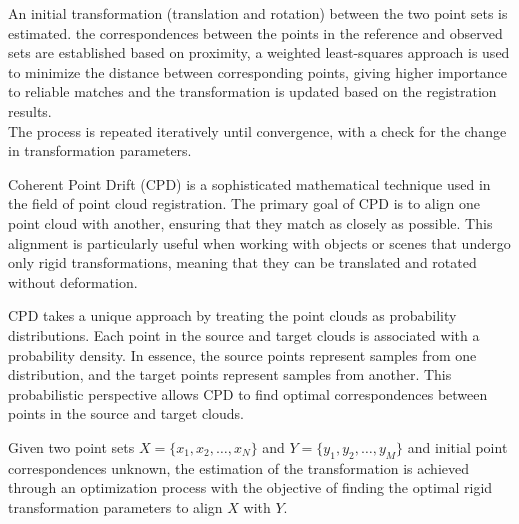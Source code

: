 An initial transformation (translation and rotation) between the two point sets is estimated. the correspondences between the points in the reference and observed sets are established based on proximity, a weighted least-squares approach is used to minimize the distance between corresponding points, giving higher importance to reliable matches and the transformation is updated based on the registration results.\\
The process is repeated iteratively until convergence, with a check for the change in transformation parameters.

Coherent Point Drift (CPD) \cite{CPD} is a sophisticated mathematical technique used in the field of point cloud registration. The primary goal of CPD is to align one point cloud with another, ensuring that they match as closely as possible. This alignment is particularly useful when working with objects or scenes that undergo only rigid transformations, meaning that they can be translated and rotated without deformation. 

CPD takes a unique approach by treating the point clouds as probability distributions. Each point in the source and target clouds is associated with a probability density. In essence, the source points represent samples from one distribution, and the target points represent samples from another. This probabilistic perspective allows CPD to find optimal correspondences between points in the source and target clouds.

Given two point sets \(X = \{x_1, x_2, \ldots, x_N\}\) and \(Y = \{y_1, y_2, \ldots, y_M\}\) and initial point correspondences unknown, the estimation of the transformation is achieved through an optimization process with the objective of finding the optimal rigid transformation parameters to align \(X\) with \(Y\).


